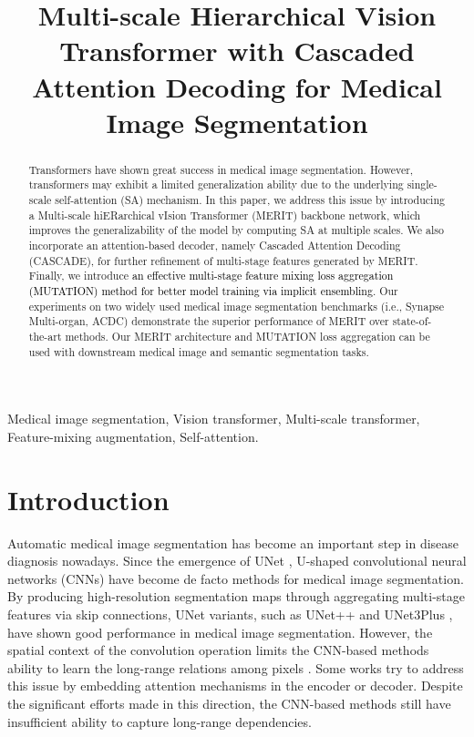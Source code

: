 \documentclass{midl}
\title[Short Title]{Multi-scale Hierarchical Vision Transformer with Cascaded Attention Decoding for Medical Image Segmentation}
\begin{document}
\maketitle

\begin{abstract}
Transformers have shown great success in medical image segmentation. However, transformers may exhibit a limited generalization ability due to the underlying single-scale self-attention (SA) mechanism. In this paper, we address this issue by introducing a Multi-scale hiERarchical vIsion Transformer (MERIT) backbone network, which improves the generalizability of the model by computing SA at multiple scales. We also incorporate an attention-based decoder, namely Cascaded Attention Decoding (CASCADE), for further refinement of multi-stage features generated by MERIT. Finally, we introduce \textcolor{black}{an effective multi-stage feature mixing loss aggregation (MUTATION) method for better model training via implicit ensembling}. Our experiments on two widely used medical image segmentation benchmarks (i.e., Synapse Multi-organ, ACDC) demonstrate the superior performance of MERIT over state-of-the-art methods. Our MERIT architecture and MUTATION loss aggregation can be used with downstream medical image and semantic segmentation tasks.  
\end{abstract}

\begin{keywords}
Medical image segmentation, Vision transformer, Multi-scale transformer, Feature-mixing augmentation, Self-attention.
\end{keywords}

\section{Introduction}
\label{introduction}
Automatic medical image segmentation has become an important step in disease diagnosis nowadays. Since the emergence of UNet \cite{ronneberger2015u}, U-shaped convolutional neural networks (CNNs) \cite{oktay2018attention, huang2020unet, zhou2018unet++, fan2020pranet} have become de facto methods for medical image segmentation. By producing high-resolution segmentation maps through aggregating multi-stage features via skip connections, UNet variants, such as UNet++ \cite{zhou2018unet++} and UNet3Plus \cite{huang2020unet}, have shown good performance in medical image segmentation. However, the spatial context of the convolution operation limits the CNN-based methods ability to learn the long-range relations among pixels \cite{cao2021swin}. Some works \cite{chen2018reverse, oktay2018attention, fan2020pranet} try to address this issue by embedding attention mechanisms in the encoder or decoder. Despite the significant efforts made in this direction, the CNN-based methods still have insufficient ability to capture long-range dependencies.
\end{document}
